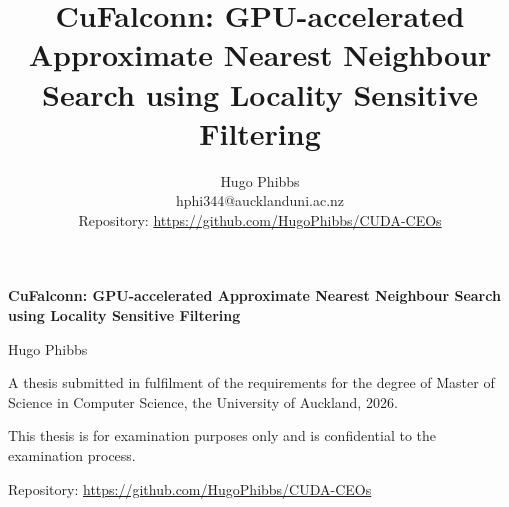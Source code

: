 \documentclass{article}
\title{CuFalconn: GPU-accelerated Approximate Nearest Neighbour Search using Locality Sensitive Filtering}
\author{   
    Hugo Phibbs \\
    hphi344@aucklanduni.ac.nz \\
    \small{Repository:} \small\url{https://github.com/HugoPhibbs/CUDA-CEOs}
}
\begin{document}





\begin{titlepage}
    \centering

    \vspace*{0.12\textheight}
    {\Huge\bfseries
    CuFalconn: GPU-accelerated Approximate Nearest Neighbour Search using Locality Sensitive Filtering\par}

    \vspace*{0.18\textheight}
    {\LARGE Hugo Phibbs\par}

    \vspace*{0.18\textheight}
    {\large
    A thesis submitted in fulfilment of the requirements for the degree of
    Master of Science in Computer Science, the University of Auckland, 2026.\par
    \vspace{1em}
    This thesis is for examination purposes only and is confidential to the examination process.\par
    }

    \vfill
    {\small Repository: \small\url{https://github.com/HugoPhibbs/CUDA-CEOs}}
\end{titlepage}

\newpage 
\end{document}
